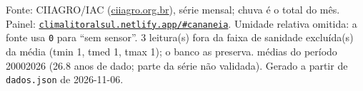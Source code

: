 \documentclass[10pt,a4paper]{article}
\begin{document}
\vspace{1pt}
{\tiny\color{cinza}
Fonte: CIIAGRO/IAC (\href{http://ciiagro.org.br}{ciiagro.org.br}), série mensal;
chuva é o total do mês. Painel:
\href{https://climalitoralsul.netlify.app/\#cananeia}%
{\texttt{climalitoralsul.netlify.app/\#cananeia}}.
Umidade relativa omitida: a fonte usa \texttt{0} para ``sem sensor''.  3 leitura(s) fora da faixa de sanidade excluída(s) da média (tmin 1, tmed 1, tmax 1); o banco as preserva.
médias do período 2000\textendash{}2026 (26.8 anos de dado; parte da série não validada).
Gerado a partir de \texttt{dados.json} de 2026-11-06.}
\end{document}
